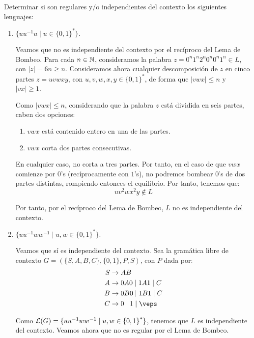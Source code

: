 \begin{ejercicio}\label{ej:1.6.9}
    Determinar si son regulares y/o independientes del contexto los siguientes lenguajes:
    \begin{enumerate}
        \item $\{uu^{-1}u \mid u\in {\{0,1\}}^{\ast}\}$.
        
        Veamos que no es independiente del contexto por el recíproco del Lema de Bombeo. Para cada $n\in \mathbb{N}$, consideramos la palabra $z=0^n1^{n}2^n0^{n}0^n1^n\in L$, con $|z|=6n\geq n$. Consideramos ahora cualquier descomposición de $z$ en cinco partes $z=uvwxy$, con $u,v,w,x,y\in {\{0,1\}}^{\ast}$, de forma que $|vwx|\leq n$ y $|vx|\geq 1$.

        Como $|vwx|\leq n$, considerando que la palabra $z$ está dividida en seis partes, caben dos opciones:
        \begin{enumerate}
            \item $vwx$ está contenido entero en una de las partes.
            \item $vwx$ corta dos partes consecutivas.
        \end{enumerate}

        En cualquier caso, no corta a tres partes. Por tanto, en el caso de que $vwx$ comienze por $0$'s (recíprocamente con $1$'s), no podremos bombear $0$'s de dos partes distintas, rompiendo entonces el equilibrio. Por tanto, tenemos que:
        \begin{equation*}
            uv^2wx^2y\notin L
        \end{equation*}

        Por tanto, por el recíproco del Lema de Bombeo, $L$ no es independiente del contexto.
        \item $\{uu^{-1}ww^{-1}\mid u,w\in {\{0,1\}}^{\ast}\}$.
        
        Veamos que sí es independiente del contexto. Sea la gramática libre de contexto $G=(\{S,A,B,C\},\{0,1\},P,S)$, con $P$ dada por:
        \begin{align*}
            S &\rightarrow AB \\
            A &\rightarrow 0A0 \mid 1A1 \mid C \\
            B &\rightarrow 0B0 \mid 1B1 \mid C \\
            C &\rightarrow 0 \mid 1\mid \veps
        \end{align*}

        Como $\mathcal{L}(G)=\{uu^{-1}ww^{-1}\mid u,w\in {\{0,1\}}^{\ast}\}$, tenemos que $L$ es independiente del contexto. Veamos ahora que no es regular por el Lema de Bombeo.


\end{enumerate}
\end{ejercicio}
